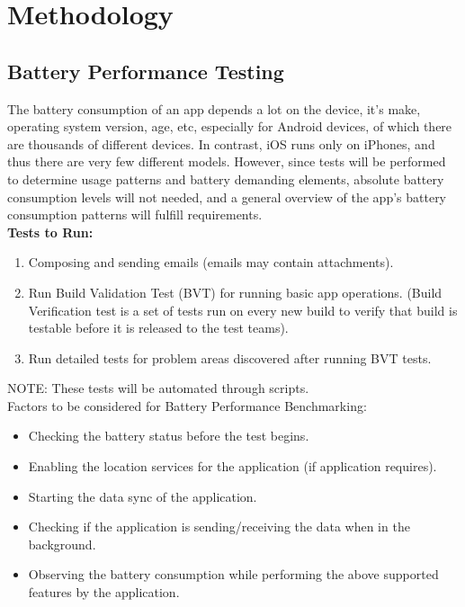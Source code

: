 \setlength\parindent{0pt}

\chapter{Methodology}

\section{Battery Performance Testing}
The battery consumption of an app depends a lot on the device, it’s make, operating system version, age, etc, especially for Android devices, of which there are thousands of different devices. In contrast, iOS runs only on iPhones, and thus there are very few different models. However, since tests will be performed to determine usage patterns and battery demanding elements, absolute battery consumption levels will not needed, and a general overview of the app’s battery consumption patterns will fulfill  requirements.\\

\textbf {Tests to Run:}
\begin{enumerate}
	\item Composing and sending emails (emails may contain attachments).
	\item Run Build Validation Test (BVT) for running basic app operations. (Build Verification test is a set of tests run on every new build to verify that build is testable before it is released to the test teams).
	\item Run detailed tests for problem areas discovered after running BVT tests. 
\end{enumerate}
NOTE: These tests will be automated through scripts. \\

Factors to be considered for Battery Performance Benchmarking:
\begin{itemize}
	\item Checking the battery status before the test begins.
	\item Enabling the location services for the application (if application requires).
	\item Starting the data sync of the application.
	\item Checking if the application is sending/receiving the data when in the background.
	\item Observing the battery consumption while performing the above supported features by the application.
\end{itemize}

